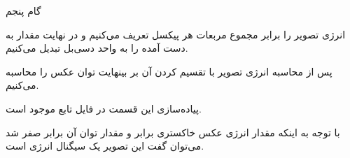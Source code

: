 \Problem
{گام پنجم}
{
    انرژی تصویر را برابر مجموع مربعات هر پیکسل تعریف می‌کنیم و در نهایت مقدار به دست آمده را به واحد دسی‌بل تبدیل می‌کنیم.
    
    پس از محاسبه انرژی تصویر با تقسیم کردن آن بر بینهایت توان عکس را محاسبه می‌کنیم.
    
    پیاده‌سازی این قسمت در فایل تابع 
    موجود است.
    
    با توجه به اینکه مقدار انرژی عکس خاکستری برابر 
    و مقدار توان آن برابر صفر شد می‌توان گفت این تصویر یک سیگنال انرژی است.
    
    \begin{center}
    \end{center}
}
